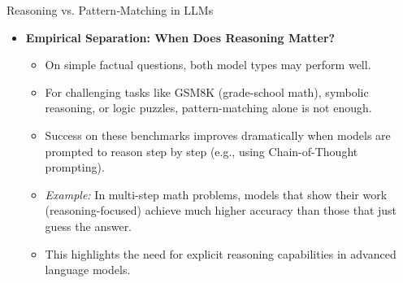 \begin{frame}[allowframebreaks]{Reasoning vs. Pattern‑Matching in LLMs}
\begin{figure}[h]
    \end{figure}
    \framebreak
    \begin{itemize}
        \item \textbf{Empirical Separation: When Does Reasoning Matter?}
        \begin{itemize}
            \item On simple factual questions, both model types may perform well.
            \item For challenging tasks like GSM8K (grade-school math), symbolic reasoning, or logic puzzles, pattern-matching alone is not enough.
            \item Success on these benchmarks improves dramatically when models are prompted to reason step by step (e.g., using Chain-of-Thought prompting).
            \item \textit{Example:} In multi-step math problems, models that show their work (reasoning-focused) achieve much higher accuracy than those that just guess the answer.
            \item This highlights the need for explicit reasoning capabilities in advanced language models.
        \end{itemize}
    \end{itemize}
\end{frame}